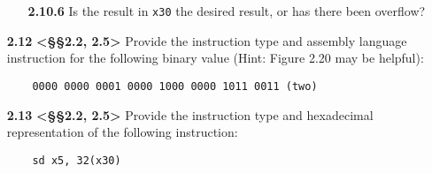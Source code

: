 \documentclass[11pt]{article}
\begin{document}
\begin{enumerate}
\begin{enumerate}
        \item[\textbf{2.10.6}] Is the result in \texttt{x30} the desired result, or has there been 
        overflow?
    \end{enumerate}

    \item[\textbf{2.12}] \textbf{<§§2.2, 2.5>} Provide the instruction type and assembly language 
    instruction for the following binary value (Hint: Figure 2.20 may be helpful): 
    \begin{verbatim}
    0000 0000 0001 0000 1000 0000 1011 0011 (two)
    \end{verbatim}
    
    \item[\textbf{2.13}] \textbf{<§§2.2, 2.5>} Provide the instruction type and hexadecimal representation of the following instruction:
    \begin{verbatim}
    sd x5, 32(x30)
    \end{verbatim}

\end{enumerate}
\end{document}
